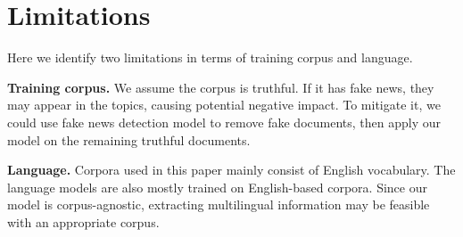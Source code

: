 \section*{Limitations}

Here we identify two limitations in terms of training corpus and language.

\textbf{Training corpus.} We assume the corpus is truthful. If it has fake news, they may appear in the topics, causing potential negative impact. To mitigate it, we could use fake news detection model to remove fake documents, then apply our model on the remaining truthful documents.

\textbf{Language.} Corpora used in this paper mainly consist of English vocabulary. The language models are also mostly trained on English-based corpora. Since our model is corpus-agnostic, extracting multilingual information may be feasible with an appropriate corpus.